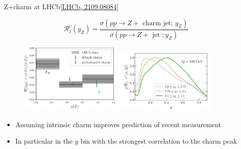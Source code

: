 \documentclass[aspectratio=43, 8pt,t]{beamer}
\begin{document}
\begin{frame}{Z+charm at LHCb}{\color{gray}\footnotesize [\hyperlink{https://arxiv.org/abs/2109.08084}{LHCb, 2109.08084}]}

  \begin{equation*}
    \mathcal{R}_j^c\left(y_Z\right) =\frac{\sigma\left(p p \rightarrow Z+\text { charm jet; } y_Z\right)}{\sigma\left(p p \rightarrow Z+\text { jet } ; y_Z\right)}
  \end{equation*}
  \begin{figure}
    \includegraphics[width=0.45\textwidth]{lhcb_data.png}
    \includegraphics[width=0.45\textwidth]{charm_Rjet_corr.png}
  \end{figure}
  \begin{itemize}
    \item Assuming intrinsic charm improves prediction of recent measurement
    \item In particular in the $y$ bin with the strongest correlation to the charm peak
  \end{itemize}
\end{frame}
\end{document}
